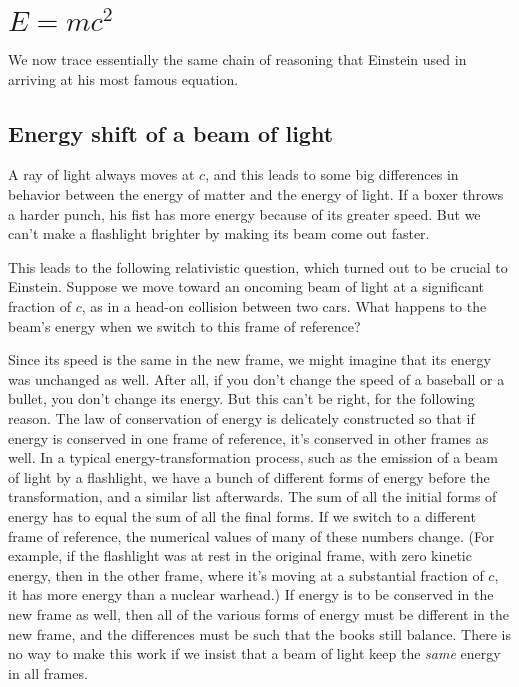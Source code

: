 \chapter{\boldmath $E=mc^2$}

We now trace essentially the same chain of reasoning that Einstein used in arriving at his most famous equation.

\section{Energy shift of a beam of light}

A ray of light always moves at $c$, and this leads to some big differences in behavior between the energy of matter
and the energy of light. If a boxer throws a harder punch, his fist has more energy because of its greater speed.
But we can't make a flashlight brighter by making its beam come out faster.

This leads to the following relativistic question, which turned out to be crucial to Einstein.
Suppose we move toward an oncoming beam of light at a significant fraction of $c$, as in a head-on collision
between two cars. What happens to the beam's energy when we switch to this frame of reference?

Since its speed is the same in the new frame, we might imagine that its energy was unchanged as well.
After all, if you don't change the speed of a baseball or a bullet, you don't change its energy.
But this can't be right, for the following reason. The law of conservation of energy is delicately
constructed so that if energy is conserved in one frame of reference, it's conserved in other frames
as well. In a typical energy-transformation process, such as the emission of a beam of light by
a flashlight, we have a bunch of different forms of energy
before the transformation, and a similar list afterwards. The sum of all the initial forms of energy
has to equal the sum of all the final forms. If we switch to a different frame of reference, the numerical
values of many of these numbers change. (For example, if the flashlight was at rest in the original frame,
with zero kinetic energy, then in the other frame, where it's moving at a substantial fraction of $c$, it
has more energy than a nuclear warhead.) If energy is to be conserved in the new frame as well, then all
of the various forms of energy must be different in the new frame, and the differences must be such that
the books still balance. There is no way to make this work if we insist that a beam of light keep the \emph{same}
energy in all frames.

